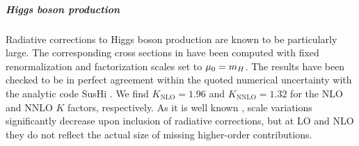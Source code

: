 \documentclass[english,11pt]{article}
\begin{document}
\subparagraph{Higgs boson production}\quad

Radiative corrections to Higgs boson production are known to be particularly large. The corresponding cross sections in  have been computed 
with fixed renormalization and factorization scales set to $\mu_0=m_{H}$. The results have been checked to be in perfect agreement within the quoted numerical 
uncertainty with the analytic code {\sc SusHi} \cite{Harlander:2012pb}. We find $K_{\textrm{NLO}}=1.96$ and $K_{\textrm{NNLO}}=1.32$ for the NLO and NNLO $K$ factors, 
respectively. As it is well known \cite{Harlander:2002wh,Anastasiou:2002yz,Ravindran:2003um}, scale variations significantly decrease upon inclusion of radiative corrections, but at LO and NLO they do not reflect the actual size of missing higher-order 
contributions.

\newcommand{\ptgamma}{\ensuremath{p_{T,\gamma}}}
\newcommand{\ptgammaone}{\ensuremath{p_{T,\gamma_1}}}
\newcommand{\ptgammatwo}{\ensuremath{p_{T,\gamma_2}}}
\newcommand{\ptlep}{\ensuremath{p_{T,{\ell}}}}
\newcommand{\etalep}{\ensuremath{|\eta_{\ell}|}}
\newcommand{\etagamma}{\ensuremath{|\eta_{\gamma}|}}
\newcommand{\mll}{\ensuremath{m_{\ell^-\ell^+}}}
\newcommand{\ptmiss}{\ensuremath{p_{T}^{\text{miss}}}}
\newcommand{\ptmissrel}{\ensuremath{p_{T}^{\text{miss,rel}}}}
\newcommand{\dRlepjet}{\ensuremath{\Delta R_{\ell j}}}
\newcommand{\dRgammajet}{\ensuremath{\Delta R_{\gamma j}}}
\newcommand{\dRlepgamma}{\ensuremath{\Delta R_{\ell\gamma}}}
\newcommand{\dRleplep}{\ensuremath{\Delta R_{\ell\ell}}}
\newcommand{\mww}{\ensuremath{m_{WW}}}
\newcommand{\mtatlas}{\ensuremath{m_T^{\rm ATLAS}}}
\newcommand{\ptww}{\ensuremath{p_{T,WW}}}
\newcommand{\ptw}{\ensuremath{p_{T,W}}}
\newcommand{\ptwone}{\ensuremath{p_{T,W_1}}}
\newcommand{\ptwtwo}{\ensuremath{p_{T,W_2}}}
\newcommand{\ptwp}{\ensuremath{p_{T,W^-}}}
\newcommand{\ptwm}{\ensuremath{p_{T,W^+}}}
\newcommand{\ptlone}{\ensuremath{p_{T,\ell_1}}}
\newcommand{\ptltwo}{\ensuremath{p_{T,\ell_2}}}
\newcommand{\Etlone}{\ensuremath{E_{T,\ell_1}}}
\newcommand{\Etltwo}{\ensuremath{E_{T,\ell_2}}}
\newcommand{\ptli}{\ensuremath{p_{T,\ell_i}}}
\newcommand{\ptll}{\ensuremath{p_{T,\ell\ell}}}
\newcommand{\ymu}{\ensuremath{y_\mu}}
\newcommand{\ye}{\ensuremath{y_e}}
\newcommand{\dphillnunu}{\ensuremath{\Delta\phi_{\ell\ell,\nu\nu}}}
\newcommand{\dphill}{\ensuremath{\Delta\phi_{\ell\ell}}}
\newcommand{\dRll}{\ensuremath{\Delta R_{\ell\ell}}}
\newcommand{\dRej}{\ensuremath{\Delta R_{e,j}}}
\newcommand{\dRllp}{\ensuremath{\Delta R_{\ell\ell'}}}
\newcommand{\etal}{\ensuremath{\eta_{\ell}}}
\newcommand{\etalp}{\ensuremath{\eta_{\ell'}}}
\end{document}
